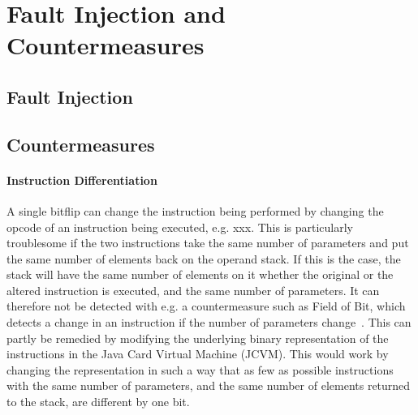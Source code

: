 \section{Fault Injection and Countermeasures}
\subsection{Fault Injection}
\subsection{Countermeasures}
\paragraph{Instruction Differentiation} 
A single bitflip can change the instruction being performed by changing the opcode of an instruction being executed, e.g. xxx. This is particularly troublesome if the two instructions take the same number of parameters and put the same number of elements back on the operand stack. If this is the case, the stack will have the same number of elements on it whether the original or the altered instruction is executed, and the same number of parameters. It can therefore not be detected with e.g. a countermeasure such as Field of Bit, which detects a change in an instruction if the number of parameters change~\cite[p. 16]{javasec}.
This can partly be remedied by modifying the underlying binary representation of the instructions in the Java Card Virtual Machine (JCVM).
This would work by changing the representation in such a way that as few as possible instructions with the same number of parameters, and the same number of elements returned to the stack, are different by one bit.
